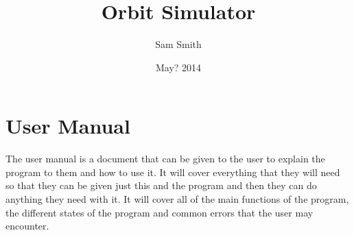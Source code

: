 \documentclass[a4paper,11pt,titlepage]{article}
\author{Sam Smith}
\title{Orbit Simulator}
\date{May? 2014}
\begin{document}
\maketitle
\tableofcontents
\clearpage


\newcommand{\add}[1]{ \clearpage}

\add{analysis}
\add{design}
\add{testing}
\add{implementation}
\add{maintenance}
\part{User Manual}
The user manual is a document that can be given to the user to explain the
program to them and how to use it. It will cover everything that they will need
so that they can be given just this and the program and then they can do
anything they need with it. It will cover all of the main functions of the
program, the different states of the program and common errors that the user may
encounter.

\add{evaluation}
\end{document}
